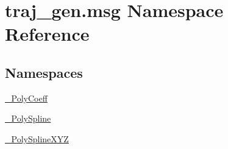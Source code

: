 \hypertarget{namespacetraj__gen_1_1msg}{}\section{traj\+\_\+gen.\+msg Namespace Reference}
\label{namespacetraj__gen_1_1msg}
\subsection*{Namespaces}
\begin{DoxyCompactItemize}
\item 
 \hyperlink{namespacetraj__gen_1_1msg_1_1___poly_coeff}{\+\_\+\+Poly\+Coeff}
\item 
 \hyperlink{namespacetraj__gen_1_1msg_1_1___poly_spline}{\+\_\+\+Poly\+Spline}
\item 
 \hyperlink{namespacetraj__gen_1_1msg_1_1___poly_spline_x_y_z}{\+\_\+\+Poly\+Spline\+X\+YZ}
\end{DoxyCompactItemize}
